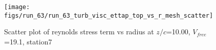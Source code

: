 \begin{figure}[H]
\centering
\texttt{[image: figs/run\_63/run\_63\_turb\_visc\_ettap\_top\_vs\_r\_mesh\_scatter]}
\caption{Scatter plot of reynolds stress term vs radius at $z/c$=10.00, $V_{free}$=19.1, station7}
\label{fig:run_63_turb_visc_ettap_top_vs_r_mesh_scatter}
\end{figure}


